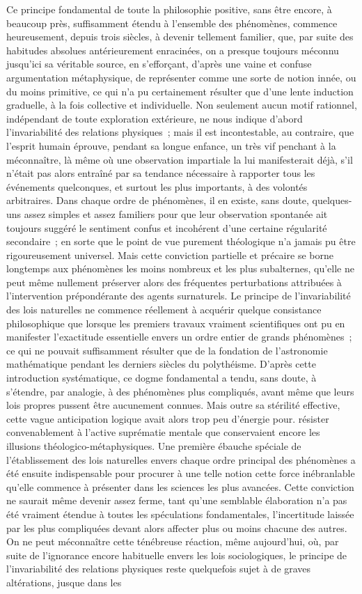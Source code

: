 \documentclass[french,twoside]{book} %
\begin{document}
Ce principe fondamental de toute la philosophie positive, sans être encore, à beaucoup près, suffisamment étendu à l’ensemble des phénomènes, commence heureusement, depuis trois siècles, à devenir tellement familier, que, par suite des habitudes absolues antérieurement enracinées, on a presque toujours méconnu jusqu’ici sa véritable source, en s’efforçant, d’après une vaine et confuse argumentation métaphysique, de représenter comme une sorte de notion innée, ou du moins primitive, ce qui n’a pu certainement résulter que d’une lente induction graduelle, à la fois collective et individuelle. Non seulement aucun motif rationnel, indépendant de toute exploration extérieure, ne nous indique d’abord l’invariabilité des relations physiques ; mais il est incontestable, au contraire, que l’esprit humain éprouve, pendant sa longue enfance, un très vif penchant à la méconnaître, là même où une observation impartiale la lui manifesterait déjà, s’il n’était pas alors entraîné par sa tendance nécessaire à rapporter tous les événements quelconques, et surtout les plus importants, à des volontés arbitraires. Dans chaque ordre de phénomènes, il en existe, sans doute, quelques-uns assez simples et assez familiers pour que leur observation spontanée ait toujours suggéré le sentiment confus et incohérent d’une certaine régularité secondaire ; en sorte que le point de vue purement théologique n’a jamais pu être rigoureusement universel. Mais cette conviction partielle et précaire se borne longtemps aux phénomènes les moins nombreux et les plus subalternes, qu’elle ne peut même nullement préserver alors des fréquentes perturbations attribuées à l’intervention prépondérante des agents surnaturels. Le principe de l’invariabilité des lois naturelles ne commence réellement à acquérir quelque consistance philosophique que lorsque les premiers travaux vraiment scientifiques ont pu en manifester l’exactitude essentielle envers un ordre entier de grands phénomènes ; ce qui ne pouvait suffisamment résulter que de la fondation de l’astronomie mathématique pendant les derniers siècles du polythéisme. D’après cette introduction systématique, ce dogme fondamental a tendu, sans doute, à s’étendre, par analogie, à des phénomènes plus compliqués, avant même que leurs lois propres pussent être aucunement connues. Mais outre sa stérilité effective, cette vague anticipation logique avait alors trop peu d’énergie pour. résister convenablement à l’active suprématie mentale que conservaient encore les illusions théologico-métaphysiques. Une première ébauche spéciale de l’établissement des lois naturelles envers chaque ordre principal des phénomènes a été ensuite indispensable pour procurer à une telle notion cette force inébranlable qu’elle commence à présenter dans les sciences les plus avancées. Cette conviction ne saurait même devenir assez ferme, tant qu’une semblable élaboration n’a pas été vraiment étendue à toutes les spéculations fondamentales, l’incertitude laissée par les plus compliquées devant alors affecter plus ou moins chacune des autres. On ne peut méconnaître cette ténébreuse réaction, même aujourd’hui, où, par suite de l’ignorance encore habituelle envers les lois sociologiques, le principe de l’invariabilité des relations physiques reste quelquefois sujet à de graves altérations, jusque dans les 
\end{document}
